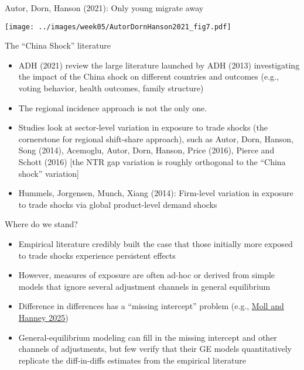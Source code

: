 \documentclass[11pt,notes=hide,aspectratio=169]{beamer}
\begin{document}
\begin{frame}{Autor, Dorn, Hanson (2021): Only young migrate away}
\begin{center}\texttt{[image: ../images/week05/AutorDornHanson2021\_fig7.pdf]}\end{center}
\end{frame}
\begin{frame}{The ``China Shock'' literature}
\begin{itemize}
\item ADH (2021) review the large literature launched by ADH (2013) investigating the impact of the China shock on different countries and outcomes (e.g., voting behavior, health outcomes, family structure)
\item 
The regional incidence approach is not the only one.
\item 
Studies look at sector-level variation in exposure to trade shocks (the cornerstone for regional shift-share approach), such as
Autor, Dorn, Hanson, Song (2014),
Acemoglu, Autor, Dorn, Hanson, Price (2016),
Pierce and Schott (2016)
[the NTR gap variation is roughly orthogonal to the ``China shock'' variation]
\item Hummels, Jorgensen, Munch, Xiang (2014): Firm-level variation in exposure to trade shocks via 
global product-level demand shocks
\end{itemize}
\end{frame}
\begin{frame}{Where do we stand?}
\begin{itemize}
\item Empirical literature credibly built the case that those initially more exposed to trade shocks experience persistent effects
\item However, measures of exposure are often ad-hoc or derived from simple models that ignore several adjustment channels in general equilibrium
\item Difference in differences has a ``missing intercept'' problem (e.g., \href{https://voxdev.org/topic/methods-measurement/missing-intercept-problem-going-micro-macro}{Moll and Hanney 2025})
\item General-equilibrium modeling can fill in the missing intercept and other channels of adjustments, but few verify that their GE models quantitatively replicate the diff-in-diffs estimates from the empirical literature
\end{itemize}
\end{frame}
\end{document}
